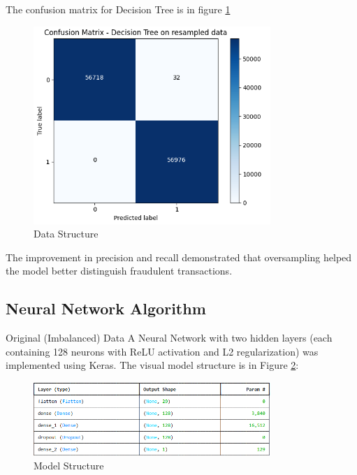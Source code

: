 \documentclass[11pt]{article}
\begin{document}
The confusion matrix for Decision Tree is in figure \ref{fig:confusion_matrix_resample}

\begin{figure}[H]
	\centering
	\includegraphics[width=0.8\textwidth]{figure/confusion_matrix_resample.png}
	\caption{Data Structure}
	\label{fig:confusion_matrix_resample}
\end{figure} 

The improvement in precision and recall demonstrated that oversampling helped the model better distinguish fraudulent transactions.

\subsection{Neural Network Algorithm}

Original (Imbalanced) Data
A Neural Network with two hidden layers (each containing 128 neurons with ReLU activation and L2 regularization) was implemented using Keras. The visual model structure is in Figure \ref{fig:model_structure}: 

\begin{figure}[H]
	\centering
	\includegraphics[width=0.8\textwidth]{figure/model_structure.png}
	\caption{Model Structure}
	\label{fig:model_structure}
\end{figure} 
\end{document}
